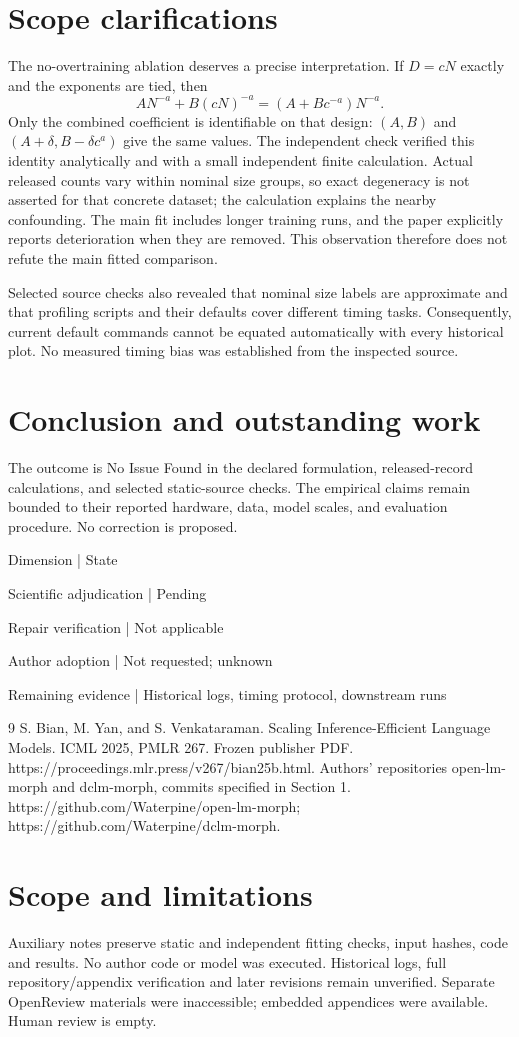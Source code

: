 \documentclass[10pt]{article}
\begin{document}
\section*{Scope clarifications}
The no-overtraining ablation deserves a precise interpretation. If \(D=cN\) exactly and the exponents are tied, then \[AN^{-a}+B(cN)^{-a}=(A+Bc^{-a})N^{-a}.\] Only the combined coefficient is identifiable on that design: \((A,B)\) and \((A+\delta,B-\delta c^a)\) give the same values. The independent check verified this identity analytically and with a small independent finite calculation. Actual released counts vary within nominal size groups, so exact degeneracy is not asserted for that concrete dataset; the calculation explains the nearby confounding. The main fit includes longer training runs, and the paper explicitly reports deterioration when they are removed. This observation therefore does not refute the main fitted comparison.\par
Selected source checks also revealed that nominal size labels are approximate and that profiling scripts and their defaults cover different timing tasks. Consequently, current default commands cannot be equated automatically with every historical plot. No measured timing bias was established from the inspected source.\par
\section*{Conclusion and outstanding work}
The outcome is No Issue Found in the declared formulation, released-record calculations, and selected static-source checks. The empirical claims remain bounded to their reported hardware, data, model scales, and evaluation procedure. No correction is proposed.\par
Dimension | State\par
Scientific adjudication | Pending\par
Repair verification | Not applicable\par
Author adoption | Not requested; unknown\par
Remaining evidence | Historical logs, timing protocol, downstream runs\par
9 S. Bian, M. Yan, and S. Venkataraman. Scaling Inference-Efficient Language Models. ICML 2025, PMLR 267. Frozen publisher PDF. https://proceedings.mlr.press/v267/bian25b.html. Authors’ repositories open-lm-morph and dclm-morph, commits specified in Section 1. https://github.com/Waterpine/open-lm-morph; https://github.com/Waterpine/dclm-morph.\par
\section*{Scope and limitations}
Auxiliary notes preserve static and independent fitting checks, input hashes, code and results. No author code or model was executed. Historical logs, full repository/appendix verification and later revisions remain unverified. Separate OpenReview materials were inaccessible; embedded appendices were available. Human review is empty.\par
\end{document}
